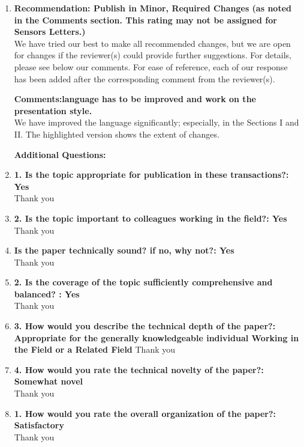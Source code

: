 \documentclass[11pt]{article}
\begin{document}
\begin{enumerate}
	\item \textbf{Recommendation: Publish in Minor, Required Changes (as noted in the Comments section. This rating may not be assigned for Sensors Letters.)
}\\
We have tried our best to make all recommended changes, but we are open for changes if the reviewer(s) could provide further suggestions. For details, please see below our comments. For ease of reference, each of our response has been added after the corresponding comment from the reviewer(s).

\textbf{Comments:language has to be improved and work on the presentation style.
} \\
We have improved the language significantly; especially, in the Sections I and II. The highlighted version shows the extent of changes.

\textbf{\textbf{Additional Questions:}}
\item\textbf{1. Is the topic appropriate for publication in these transactions?: Yes
}\\
Thank you

\item\textbf{2. Is the topic important to colleagues working in the field?: Yes}\\
Thank you

\item\textbf{Is the paper technically sound? if no, why not?: Yes}\\
Thank you
%

\item\textbf{2. Is the coverage of the topic sufficiently comprehensive and balanced? : Yes
}\\
Thank you

\item\textbf{3. How would you describe the technical depth of the paper?: Appropriate for the generally knowledgeable individual Working in the Field or a Related Field}
Thank you

\item\textbf{4. How would you rate the technical novelty of the paper?: Somewhat novel}\\
Thank you

\item\textbf{1. How would you rate the overall organization of the paper?: Satisfactory}\\
Thank you


\end{enumerate}
\end{document}

